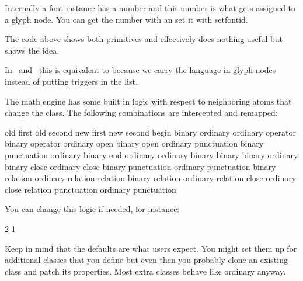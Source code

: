 Internally a font instance has a number and this number is what gets assigned to
a glyph node. You can get the number with  an set it with \prm
{setfontid}.

\starttyping
\setfontid\fontid\font
\stoptyping

The code above shows both primitives and effectively does nothing useful but
shows the idea.

\stopnewprimitive

\startoldprimitive[title={\prm {setlanguage}}]

In \LUATEX\ and \LUAMETATEX\ this is equivalent to  because we
carry the language in glyph nodes instead of putting triggers in the list.

\stopoldprimitive

\startnewprimitive[title={\prm {setmathatomrule}}]

The math engine has some built in logic with respect to neighboring atoms that
change the class. The following combinations are intercepted and remapped:

\starttabulate[|c|c|c|c|]
\BC old first   \BC old second  \NC new first   \NC new second  \NC \NR
\ML
\NC begin       \NC binary      \NC ordinary    \NC ordinary    \NC \NR
\NC             \NC             \NC             \NC             \NC \NR
\NC operator    \NC binary      \NC operator    \NC ordinary    \NC \NR
\NC open        \NC binary      \NC open        \NC ordinary    \NC \NR
\NC punctuation \NC binary      \NC punctuation \NC ordinary    \NC \NR
\NC             \NC             \NC             \NC             \NC \NR
\NC binary      \NC end         \NC ordinary    \NC ordinary    \NC \NR
\NC binary      \NC binary      \NC binary      \NC ordinary    \NC \NR
\NC binary      \NC close       \NC ordinary    \NC close       \NC \NR
\NC binary      \NC punctuation \NC ordinary    \NC punctuation \NC \NR
\NC binary      \NC relation    \NC ordinary    \NC relation    \NC \NR
\NC             \NC             \NC             \NC             \NC \NR
\NC relation    \NC binary      \NC relation    \NC ordinary    \NC \NR
\NC relation    \NC close       \NC ordinary    \NC close       \NC \NR
\NC relation    \NC punctuation \NC ordinary    \NC punctuation \NC \NR
\stoptabulate

You can change this logic if needed, for instance:

\starttyping
{} 2  1
\stoptyping

Keep in mind that the defaults are what users expect. You might set them up for
additional classes that you define but even then you probably clone an existing
class and patch its properties. Most extra classes behave like ordinary anyway.

